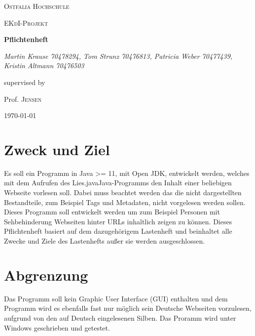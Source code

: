 \documentclass[12pt]{scrartcl}
\begin{document}
\begin{titlepage}
	\centering
	{\scshape\LARGE Ostfalia Hochschule \par}
	\vspace{1cm}
	{\scshape\Large EKdI-Projekt\par}
	\vspace{1.5cm}
	{\huge\bfseries Pflichtenheft\par}
	\vspace{2cm}
	{\Large\itshape Martin Krause 70478294, Tom Strunz 70476813, Patricia Weber 70477439, Kristin Altmann 70476503\par}
	\vfill
	supervised by\par
	Prof. \textsc{Jensen}

	\vfill

	{\large \today\par}
\end{titlepage}


\tableofcontents
\newpage


\section{Zweck und Ziel}
Es soll ein Programm in Java >= 11, mit Open JDK, entwickelt werden, welches mit dem Aufrufen des \glqq Lies.java\grqq Java-Programms den Inhalt einer beliebigen Webseite vorlesen soll. Dabei muss beachtet werden das die nicht dargestellten Bestandteile, zum Beispiel Tags und Metadaten, nicht vorgelesen werden sollen. Dieses Programm soll entwickelt werden um zum Beispiel Personen mit Sehbehinderung Webseiten hinter URLs inhaltlich zeigen zu können. Dieses Pflichtenheft basiert auf dem dazugehörigem Lastenheft und beinhaltet alle Zwecke und Ziele des Lastenhefts außer sie werden ausgeschlossen.

\section{Abgrenzung}
Das Programm soll kein Graphic User Interface (GUI) enthalten und dem Programm wird es ebenfalls fast nur möglich sein Deutsche Webseiten vorzulesen, aufgrund von den auf Deutsch eingelesenen Silben. Das Proramm wird unter Windows geschrieben und getestet.
\end{document}

